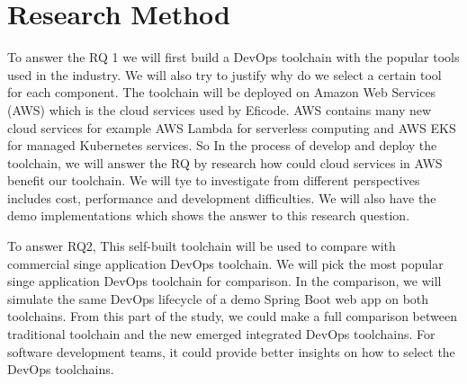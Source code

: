 \section{Research Method}
To answer the RQ 1 we will first build a DevOps toolchain with the popular tools used in the industry. We will also try to justify why do we select a certain tool for each component. The toolchain will be deployed on Amazon Web Services (AWS) which is the cloud services used by Eficode. AWS contains many new cloud services for example AWS Lambda for serverless computing and AWS EKS for managed Kubernetes services. 
So In the process of develop and deploy the toolchain, we will answer the RQ by research how could cloud services in AWS benefit our toolchain. We will tye to investigate from different perspectives includes cost, performance and development difficulties. We will also have the demo implementations which shows the answer to this research question.
\par
To answer RQ2, This self-built toolchain will be used to compare with commercial singe application DevOps toolchain. We will pick the most popular singe application DevOps toolchain for comparison. In the comparison, we will simulate the same DevOps lifecycle of a demo Spring Boot web app on both toolchains. 
From this part of the study, we could make a full comparison between traditional toolchain and the new emerged integrated DevOps toolchains. For software development teams, it could provide better insights on how to select the DevOps toolchains.
